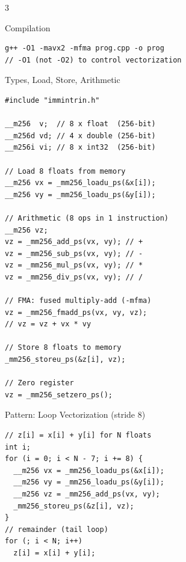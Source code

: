 \documentclass[8pt,a4paper,landscape]{article}
\begin{document}
\newpage

\begin{center}
\colorbox{titlebg}{}
\end{center}
\vspace{2mm}

\begin{multicols}{3}

\begin{sectionbox}{Compilation}
\begin{lstlisting}
g++ -O1 -mavx2 -mfma prog.cpp -o prog
// -O1 (not -O2) to control vectorization
\end{lstlisting}
\end{sectionbox}

\begin{highlightbox}{{ Types, Load, Store, Arithmetic }}
\begin{lstlisting}
#include "immintrin.h"

__m256  v;  // 8 x float  (256-bit)
__m256d vd; // 4 x double (256-bit)
__m256i vi; // 8 x int32  (256-bit)

// Load 8 floats from memory
__m256 vx = _mm256_loadu_ps(&x[i]);
__m256 vy = _mm256_loadu_ps(&y[i]);

// Arithmetic (8 ops in 1 instruction)
__m256 vz;
vz = _mm256_add_ps(vx, vy); // + 
vz = _mm256_sub_ps(vx, vy); // -
vz = _mm256_mul_ps(vx, vy); // *
vz = _mm256_div_ps(vx, vy); // /

// FMA: fused multiply-add (-mfma)
vz = _mm256_fmadd_ps(vx, vy, vz);
// vz = vz + vx * vy

// Store 8 floats to memory
_mm256_storeu_ps(&z[i], vz);

// Zero register
vz = _mm256_setzero_ps();
\end{lstlisting}
\end{highlightbox}

\begin{sectionbox}{Pattern: Loop Vectorization (stride 8)}
\begin{lstlisting}
// z[i] = x[i] + y[i] for N floats
int i;
for (i = 0; i < N - 7; i += 8) {
  __m256 vx = _mm256_loadu_ps(&x[i]);
  __m256 vy = _mm256_loadu_ps(&y[i]);
  __m256 vz = _mm256_add_ps(vx, vy);
  _mm256_storeu_ps(&z[i], vz);
}
// remainder (tail loop)
for (; i < N; i++)
  z[i] = x[i] + y[i];
\end{lstlisting}
\end{sectionbox}


\end{multicols}
\end{document}
